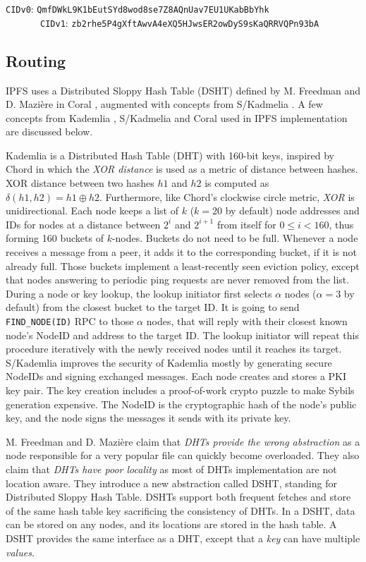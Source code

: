 \documentclass[a4paper,11pt,oneside]{report}
\begin{document}
\texttt{CIDv0}: \texttt{QmfDWkL9K1bEutSYd8wod8se7Z8AQnUav7EU1UKabBbYhk}\\
\-\ \-\ \-\ \-\ \-\ \-\ \-\ \texttt{CIDv1}: \texttt{zb2rhe5P4gXftAwvA4eXQ5HJwsER2owDyS9sKaQRRVQPn93bA}


\subsection{Routing}

IPFS uses a Distributed Sloppy Hash Table (DSHT) defined by M. Freedman and D. Mazière in Coral \cite{coral}, augmented with concepts from S/Kadmelia \cite{skad}. A few concepts from Kademlia \cite{kademlia}, S/Kadmelia
and Coral used in IPFS implementation are discussed below.

Kademlia \cite{kademlia} is a Distributed Hash Table (DHT) with 160-bit keys, inspired by Chord \cite{chord} in which the \textit{XOR distance} is used as a metric of distance between hashes. XOR distance between two hashes $h1$ and $h2$ is computed as $\delta(h1,h2)=h1 \oplus h2$. Furthermore, like Chord's clockwise circle metric, \textit{XOR} is unidirectional. Each node keeps a list of $k$ ($k=20$ by default) node addresses and IDs for nodes at a distance between $2^i$ and $2^{i+1}$ from itself for $0 \leq i < 160$, thus forming 160 buckets of $k$-nodes. Buckets do not need to be full. Whenever a node receives a message from a peer, it adds it to the corresponding bucket, if it is not already full. Those buckets implement a least-recently seen eviction policy, except that nodes answering to periodic ping requests are never removed from the list.
During a node or key lookup, the lookup initiator first selects $\alpha$ nodes ($\alpha=3$ by default) from the closest bucket to the target ID. It is going to send \texttt{FIND\_NODE(ID)} RPC to those $\alpha$ nodes, that will reply with their closest known node's NodeID and address to the target ID. The lookup initiator will repeat this procedure iteratively with the newly received nodes until it reaches its target. S/Kademlia \cite{skad} improves the security of Kademlia mostly by generating secure NodeIDs and signing exchanged messages. Each node creates and stores a PKI key pair. The key creation includes a proof-of-work crypto puzzle to make Sybils generation expensive. The NodeID is the cryptographic hash of the node's public key, and the node signs the messages it sends with its private key.

M. Freedman and D. Mazière \cite{coral} claim that \textit{DHTs provide the wrong abstraction} as a node responsible for a very popular file can quickly become overloaded. They also claim that \textit{DHTs have poor locality} as most of DHTs implementation are not location aware. They introduce a new abstraction called DSHT, standing for Distributed Sloppy Hash Table. DSHTs support both frequent fetches and store of the same hash table key sacrificing the consistency of DHTs. In a DSHT, data can be stored on any nodes, and its locations are stored in the hash table.
A DSHT provides the same interface as a DHT, except that a \textit{key} can have multiple \textit{values}.
\end{document}
